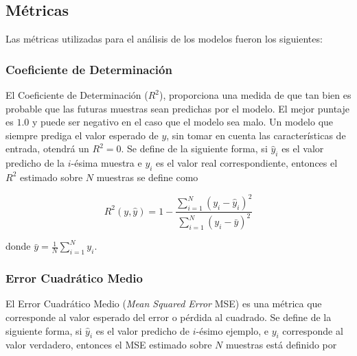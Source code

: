 \documentclass[spanish]{article}
\begin{document}
            
            
            
        
        \subsection{Métricas}
        
            Las métricas utilizadas para el análisis de los modelos fueron los siguientes:
            
            \subsubsection{Coeficiente de Determinación}
            
                El Coeficiente de Determinación ($R^2$), proporciona una medida de que tan bien es probable que las futuras muestras sean predichas
                por el modelo. El mejor puntaje es $1.0$ y puede ser negativo en el caso que el modelo sea malo. Un modelo que siempre prediga el 
                valor esperado de $y$, sin tomar en cuenta las características de entrada, otendrá un $R^2=0$. Se define de la siguiente forma,
                si $\hat{y}_i$ es el valor predicho de la $i$-ésima muestra e $y_i$ es el valor real correspondiente, entonces el $R^2$ estimado sobre
                $N$ muestras se define como
                
                \begin{equation}
                    R^2(y, \hat{y}) = 1 - \frac{\sum_{i=1}^{N} (y_i - \hat{y}_i)^2}{\sum_{i=1}^{N} (y_i - \bar{y})^2}
                \end{equation}

                donde $\bar{y} =  \frac{1}{N} \sum_{i=1}^{N} y_i$.
            
            
            \subsubsection{Error Cuadrático Medio}
            
                El Error Cuadrático Medio (\emph{Mean Squared Error} MSE) es una métrica que corresponde al valor esperado del error o pérdida al cuadrado.
                Se define de la siguiente forma, si $\hat{y}_i$ es el valor predicho de $i$-ésimo ejemplo, e $y_i$ corresponde al valor verdadero, entonces
                el MSE estimado sobre $N$ muestras está definido por
                
\end{document}

